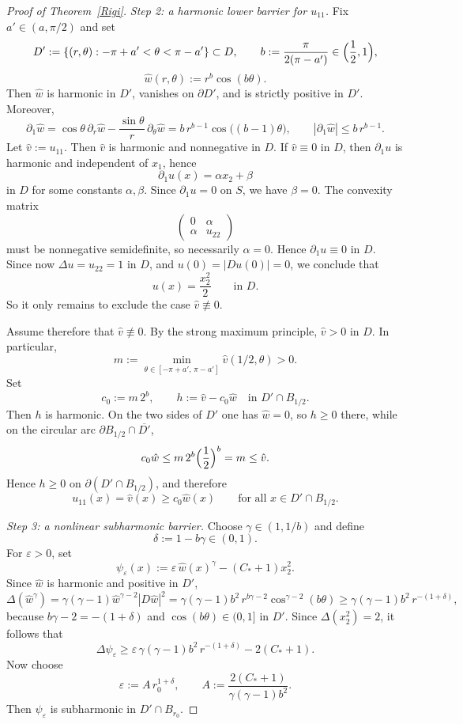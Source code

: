 \documentclass[10pt,a4paper]{amsart}
\begin{document}
\begin{proof}[Proof of Theorem~\ref{Rigi}]
\medskip
\noindent\textit{Step 2: a harmonic lower barrier for $u_{11}$.}
Fix $a'\in(a,\pi/2)$ and set
\[
D':=\{(r,\theta): -\pi+a'<\theta<\pi-a'\}\subset D,
\qquad
b:=\frac{\pi}{2(\pi-a')}\in\Bigl(\frac12,1\Bigr),
\]
\[
\hat w(r,\theta):=r^b\cos(b\theta).
\]
Then $\hat w$ is harmonic in $D'$, vanishes on $\partial D'$, and is strictly positive in $D'$.
Moreover,
\begin{equation}\label{eq:d1w}
\partial_1\hat w
=
\cos\theta\,\partial_r\hat w-\frac{\sin\theta}{r}\,\partial_\theta\hat w
=
b\,r^{b-1}\cos\bigl((b-1)\theta\bigr),
\qquad
|\partial_1\hat w|\le b\,r^{b-1}.
\end{equation}
Let
$\hat v:=u_{11}.$
Then $\hat v$ is harmonic and nonnegative in $D$.
If $\hat v\equiv0$ in $D$, then $\partial_1u$ is harmonic and independent of $x_1$, hence
\[
\partial_1u(x)=\alpha x_2+\beta
\]
in $D$ for some constants $\alpha,\beta$.
Since $\partial_1u=0$ on $S$, we have $\beta=0$.
The convexity matrix
\[
\begin{pmatrix}
0 & \alpha\\
\alpha & u_{22}
\end{pmatrix}
\]
must be nonnegative semidefinite, so necessarily $\alpha=0$.
Hence $\partial_1u\equiv0$ in $D$.
Since now $\Delta u=u_{22}=1$ in $D$, and $u(0)=|D u(0)|=0$, we conclude that
\[
u(x)=\frac{x_2^2}{2}
\qquad\text{in }D.
\]
So it only remains to exclude the case $\hat v\not\equiv0$.

Assume therefore that $\hat v\not\equiv0$.
By the strong maximum principle, $\hat v>0$ in $D$.
In particular,
\[
m:=\min_{\theta\in[-\pi+a',\,\pi-a']}\hat v(1/2,\theta)>0.
\]
Set
\[
c_0:=m\,2^b,
\qquad
h:=\hat v-c_0\hat w
\quad\text{in }D'\cap B_{1/2}.
\]
Then $h$ is harmonic. On the two sides of $D'$ one has $\hat w=0$, so $h\ge0$ there, while
on the circular arc $\partial B_{1/2}\cap \overline{D'}$,
\[
c_0\hat w\le m\,2^b \Bigl(\frac12\Bigr)^b=m\le \hat v.
\]
Hence $h\ge0$ on $\partial(D'\cap B_{1/2})$, and therefore
\begin{equation}\label{eq:v-lower}
u_{11}(x)=\hat v(x)\ge c_0\hat w(x)
\qquad\text{for all }x\in D'\cap B_{1/2}.
\end{equation}

\medskip
\noindent\textit{Step 3: a nonlinear subharmonic barrier.}
Choose $\gamma\in(1,1/b)$ and define
\[
\delta:=1-b\gamma\in(0,1).
\]
For $\varepsilon>0$, set
\[
\psi_\varepsilon(x):=\varepsilon\,\hat w(x)^\gamma-(C_\ast+1)x_2^2.
\]
Since $\hat w$ is harmonic and positive in $D'$,
\[
\Delta(\hat w^\gamma)
=
\gamma(\gamma-1)\hat w^{\gamma-2}|D \hat w|^2
=
\gamma(\gamma-1)b^2\,r^{b\gamma-2}\cos^{\gamma-2}(b\theta)
\ge \gamma(\gamma-1)b^2\,r^{-(1+\delta)},
\]
because $b\gamma-2=-(1+\delta)$ and $\cos(b\theta)\in(0,1]$ in $D'$.
Since $\Delta(x_2^2)=2$, it follows that
\[
\Delta\psi_\varepsilon
\ge
\varepsilon\,\gamma(\gamma-1)b^2\,r^{-(1+\delta)}-2(C_\ast+1).
\]
Now choose
\begin{equation}\label{eq:r0eps}
\varepsilon:=A\,r_0^{1+\delta},
\qquad
A:=\frac{2(C_\ast+1)}{\gamma(\gamma-1)b^2}.
\end{equation}
Then $\psi_\varepsilon$ is subharmonic in $D'\cap B_{r_0}$.


\end{proof}
\end{document}
